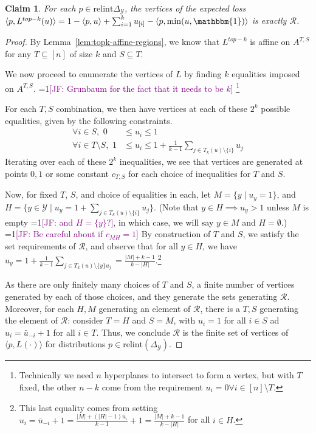 \documentclass[12pt]{article}
\newcommand{\Comments}{1}
\newcommand{\mynote}[2]{\ifnum\Comments=1\textcolor{#1}{#2}\fi}
\newcommand{\jessie}[1]{\mynote{purple}{[JF: #1]}}
\newcommand{\simplex}{\Delta_\Y}
\newcommand{\R}{\mathcal{R}}
\newcommand{\Y}{\mathcal{Y}}
\newcommand{\inprod}[2]{\langle #1, #2 \rangle}%
\newcommand{\ones}{\mathbbm{1}}
\newtheorem{claim}{Claim}
\begin{document}
\begin{claim}\label{claim:R-vertices}
	For each $p \in \mathrm{relint}\simplex$, the vertices of the expected loss $\inprod{p}{L^{top-k}(u)} = 1 - \inprod{p}{u} + \sum_{i=1}^k u_{[i]} - \inprod{p}{\min(u,\ones)}$ is exactly $\R$.
\end{claim}
\begin{proof}
	By Lemma~\ref{lem:topk-affine-regions}, we know that $L^{top-k}$ is affine on $A^{T,S}$ for any $T \subseteq [n]$ of size $k$ and $S \subseteq T$. 

	We now proceed to enumerate the vertices of $L$ by finding $k$ equalities imposed on $A^{T,S}$. \jessie{Grunbaum for the fact that it needs to be $k$}
	\footnote{Technically we need $n$ hyperplanes to intersect to form a vertex, but with $T$ fixed, the other $n-k$ come from the requirement $u_i = 0 \forall i \in [n] \setminus T$.}
	
	For each $T,S$ combination, we then have vertices at each of these $2^k$ possible equalities, given by the following constraints.
	\begin{align*}
	\forall i \in S, \,\, 0 &\leq u_i \leq 1 \\
	\forall i \in T \setminus S, \,\, 1 &\leq u_i \leq 1 + \frac 1 {k-1} \sum_{j \in T_k(u) \setminus \{i\}} u_j 
	\end{align*}
	Iterating over each of these $2^k$ inequalities, we see that vertices are generated at points $0,1$ or some constant $c_{T,S}$ for each choice of inequalities for $T$ and $S$.

	Now, for fixed $T$, $S$, and choice of equalities in each, let $M = \{y \mid u_y = 1\}$, and $H = \{y \in \Y \mid u_y = 1 + \sum_{j \in T_k(u) \setminus \{i\}} u_j\}$.
	(Note that $y \in H \implies u_y > 1$ unless $M$ is empty \jessie{and $H = \{y\}$?}, in which case, we will say $y \in M$ and $H = \emptyset$.) 
	\jessie{Be careful about if $c_{MH} = 1$}
	By construction of $T$ and $S$, we satisfy the set requirements of $\R$, and observe that for all $y \in H$, we have $u_y = 1 + \frac 1 {k-1}\sum_{j \in T_k(u) \setminus \{y\} u_j} = \frac{|M| + k -1}{k - |H|}$.\footnote{This last equality comes from setting $u_i = \bar u_{-i} +1 = \frac{|M| + (|H|-1)u_i}{k-1} + 1 = \frac{|M| + k - 1}{k - |H|}$ for all $i \in H$.}
	
	As there are only finitely many choices of $T$ and $S$, a finite number of vertices generated by each of those choices, and they generate the sets generating $\R$.
	Moreover, for each $H,M$ generating an element of $\R$, there is a $T,S$ generating the element of $\R$: consider $T = H$ and $S = M$, with $u_i = 1$ for all $i \in S$ ad $u_i = \bar u_{-i} + 1$ for all $i \in T$.
	Thus, we conclude $\R$ is the finite set of vertices of $\inprod{p}{L(\cdot)}$ for distributions $p \in \mathrm{relint}(\simplex)$.
\end{proof}
\end{document}
